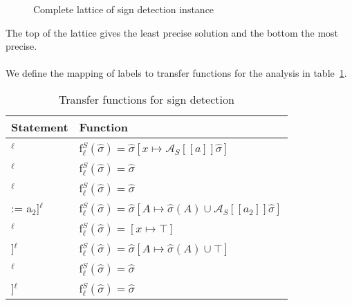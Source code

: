  \begin{figure}
 \centering
  \caption{Complete lattice of sign detection instance}
 
  \label{fig:sign_detection_complete_lattice}
 \end{figure}
\noindent The top of the lattice gives the least precise solution and the bottom the most precise.
\\\\
We define the mapping of labels to transfer functions for the analysis in table~\ref{table:sign_detection_functions}.
\begin{table}[h]
\begin{tabular}{| l | l |}
  \hline
  Statement & Function \\
  \hline
  \hline
  [x := a]$^\ell$ & f$_\ell^S (\widehat{\sigma}) = \widehat{\sigma}[x \mapsto \mathcal{A}_S[\![a]\!] \widehat{\sigma} ]$ \\
  \hline
 [skip]$^\ell$ & f$_\ell^S (\widehat{\sigma}) = \widehat{\sigma}$\\
  \hline
 [b]$^\ell$ & f$_\ell^S (\widehat{\sigma}) = \widehat{\sigma}$\\
  \hline
  [A[a$_1$] := a$_2$]$^\ell$ & f$_\ell^S (\widehat{\sigma}) = \widehat{\sigma}[A\mapsto \widehat{\sigma}(A)\cup \mathcal{A}_S[\![a_2]\!] \widehat{\sigma}]$\\
  \hline
  [read x]$^\ell$ & f$_\ell^S (\widehat{\sigma}) = [x \mapsto \top]$ \\
  \hline
  [read A[a]]$^\ell$ & f$_\ell^S (\widehat{\sigma}) =  \widehat{\sigma}[A\mapsto \widehat{\sigma}(A)\cup \top]$\\
  \hline
  [write x]$^\ell$ & f$_\ell^S (\widehat{\sigma}) = \widehat{\sigma}$\\
  \hline
  [write A[n]]$^\ell$ & f$_\ell^S (\widehat{\sigma}) = \widehat{\sigma}$\\
  \hline
\end{tabular}
\centering
\caption{Transfer functions for sign detection}
\label{table:sign_detection_functions}
\end{table}
